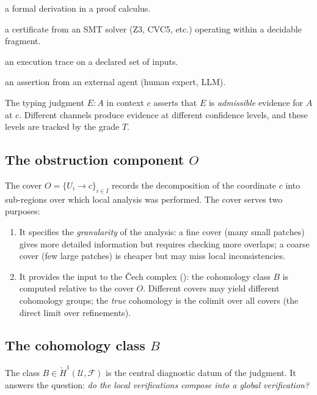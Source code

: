 \begin{description}[leftmargin=2.5em]
\item[Proof:] a formal derivation in a proof calculus.
\item[Solver:] a certificate from an SMT solver (Z3, CVC5, etc.)
  operating within a decidable fragment.
\item[Runtime:] an execution trace on a declared set of inputs.
\item[Oracle:] an assertion from an external agent (human expert, LLM).
\end{description}

The typing judgment $E : A$ in context $c$ asserts that $E$ is
\emph{admissible} evidence for $A$ at $c$.  Different channels produce
evidence at different confidence levels, and these levels are
tracked by the grade $T$.

\subsection{The obstruction component \texorpdfstring{$O$}{O}}
\label{sec:judgment:obstruction}

The cover $O = \{U_i \to c\}_{i \in I}$ records the decomposition of
the coordinate $c$ into sub-regions over which local analysis was
performed.  The cover serves two purposes:

\begin{enumerate}
\item It specifies the \emph{granularity} of the analysis: a fine cover
  (many small patches) gives more detailed information but requires
  checking more overlaps; a coarse cover (few large patches) is cheaper
  but may miss local inconsistencies.

\item It provides the input to the \v{C}ech complex
  (): the cohomology class $B$ is computed relative to
  the cover $O$.  Different covers may yield different cohomology
  groups; the \emph{true} cohomology is the colimit over all covers
  (the direct limit over refinements).
\end{enumerate}

\subsection{The cohomology class \texorpdfstring{$B$}{B}}
\label{sec:judgment:cohomology}

The class $B \in \check{H}^1(\mathcal{U}, \mathcal{F})$ is the central
diagnostic datum of the judgment.  It answers the question:
\emph{do the local verifications compose into a global verification?}


